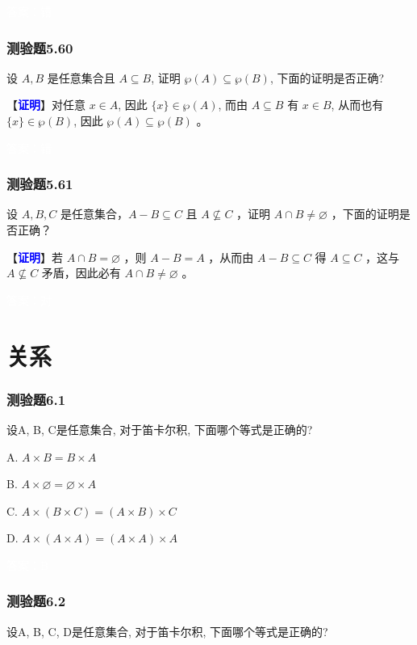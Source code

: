 \documentclass[UTF8, heading=true]{ctexart}
\begin{document}
\textcolor{white}{答案：错}
\subsubsection{测验题5.60}
设 $A, B$ 是任意集合且 $A \subseteq B$, 证明 $\wp(A) \subseteq \wp(B)$, 下面的证明是否正确?

【\textcolor{blue}{\textbf{证明}}】对任意 $x \in A$, 因此 $\{x\} \in \wp(A)$, 而由 $A \subseteq B$ 有 $x \in B$, 从而也有 $\{x\} \in \wp(B)$, 因此 $\wp(A) \subseteq \wp(B)$ 。

\textcolor{white}{答案：错}

\subsubsection{测验题5.61}

设 $A, B, C$ 是任意集合，$A-B \subseteq C$ 且 $A \nsubseteq C$ ，证明 $A \cap B \neq \varnothing$ ，下面的证明是否正确？

【\textcolor{blue}{\textbf{证明}}】若 $A \cap B=\varnothing$ ，则 $A-B=A$ ，从而由 $A-B \subseteq C$ 得 $A \subseteq C$ ，这与 $A \nsubseteq C$ 矛盾，因此必有 $A \cap B \neq \varnothing$ 。


\textcolor{white}{答案：对}

\clearpage

\section{关系}

\subsubsection{测验题6.1}

设A, B, C是任意集合, 对于笛卡尔积, 下面哪个等式是正确的?

A. 
$
A \times B=B \times A
$

B. 
$
A \times \varnothing=\varnothing \times A
$

C. 
$
A \times(B \times C)=(A \times B) \times C
$

D. 
$
A \times(A \times A)=(A \times A) \times A
$

\textcolor{white}{答案：B}


\subsubsection{测验题6.2}
设A, B, C, D是任意集合, 对于笛卡尔积, 下面哪个等式是正确的?
\end{document}
